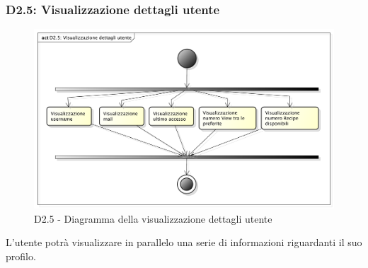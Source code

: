 		\subsubsection{D2.5: Visualizzazione dettagli utente} %
		\label{ssub:visualizzazione_dettagli_utente}
		\begin{figure}[!htbp]
			\centering
			\centerline{\includegraphics[scale=0.45]{./images/D2_5.pdf}}
			\caption{D2.5 - Diagramma della visualizzazione dettagli utente}
		\end{figure}
		\noindent
		L'utente potrà visualizzare in parallelo una serie di informazioni riguardanti il suo profilo.

